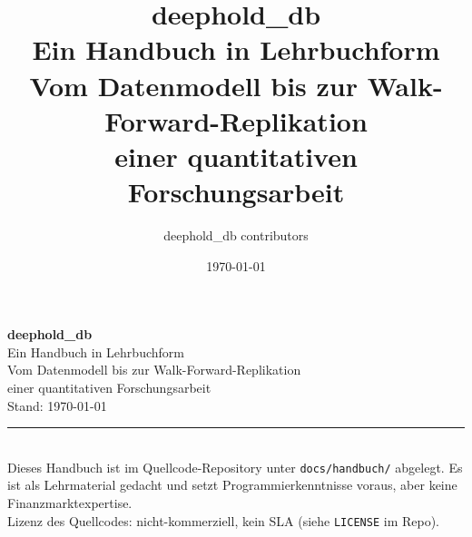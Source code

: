 \documentclass[11pt,a4paper,twoside,openright]{book}
\title{
  \vspace{2cm}
  {\Huge\bfseries deephold\_db}\\[0.5cm]
  {\Large Ein Handbuch in Lehrbuchform}\\[0.5cm]
  {\large Vom Datenmodell bis zur Walk-Forward-Replikation\\
   einer quantitativen Forschungsarbeit}\\[2cm]
}
\author{deephold\_db contributors}
\date{\today}
\begin{document}
\frontmatter
\maketitle
\thispagestyle{empty}

\vspace*{4cm}
\begin{center}
  {\Huge\bfseries deephold\_db}\\[0.5cm]
  {\Large Ein Handbuch in Lehrbuchform}\\[2cm]
  {\large Vom Datenmodell bis zur Walk-Forward-Replikation\\
  einer quantitativen Forschungsarbeit}\\[4cm]
  {\small Stand: \today}\\[4cm]
\end{center}

\vspace*{\fill}
\noindent\rule{\textwidth}{0.4pt}\\
{\footnotesize
Dieses Handbuch ist im Quellcode-Repository unter
\texttt{docs/handbuch/} abgelegt. Es ist als Lehrmaterial gedacht
und setzt Programmierkenntnisse voraus, aber keine
Finanzmarktexpertise.\\[0.5em]
Lizenz des Quellcodes: nicht-kommerziell, kein SLA (siehe \texttt{LICENSE} im Repo).
}

\cleardoublepage



\tableofcontents

\listoffigures
{}
\thispagestyle{empty}
\listoftables
{}
\thispagestyle{empty}

\mainmatter












\appendix






\printindex

\printbibliography[heading=bibintoc]
\end{document}
